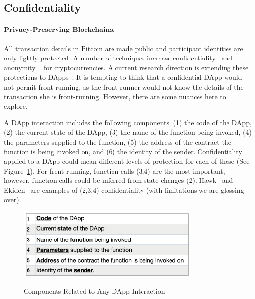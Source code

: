 \subsection{Confidentiality}\label{sec:confidentiality}

\paragraph{Privacy-Preserving Blockchains.}

All transaction details in Bitcoin are made public and participant identities are only lightly protected. A number of techniques increase confidentiality~\cite{bunzBulletproofs,maxwell2015confidential} and anonymity ~\cite{miers2013zerocoin,cryptoeprint2015,sasson2014zerocash} for cryptocurrencies. A current research direction is extending these protections to DApps~\cite{aztec2018,ZoeEth2017}. It is tempting to think that a confidential DApp would not permit front-running, as the front-runner would not know the details of the transaction she is front-running. However, there are some nuances here to explore.

A DApp interaction includes the following components: (1) the code of the DApp, (2) the current state of the DApp, (3) the name of the function being invoked, (4) the parameters supplied to the function, (5) the address of the contract the function is being invoked on, and (6) the identity of the sender. Confidentiality applied to a DApp could mean different levels of protection for each of these (See Figure~\ref{fig:confidentialitycomponents}). For front-running, function calls (3,4) are the most important, however, function calls could be inferred from state changes (2). Hawk~\cite{kosba2016hawk} and Ekiden~\cite{cheng2018ekiden} are examples of (2,3,4)-confidentiality (with limitations we are glossing over).


\begin{figure}[t]
    \centering
{\includegraphics[width=0.8\textwidth]{figures/confidentiality_components.png}}
{\caption{Components Related to Any DApp Interaction}\label{fig:confidentialitycomponents}}
\end{figure}


